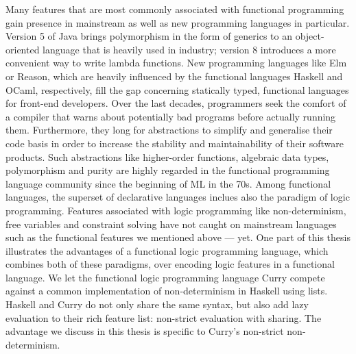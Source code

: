 %


Many features that are most commonly associated with functional programming gain presence in mainstream as well as new programming languages in particular.
Version 5 of Java brings polymorphism in the form of generics to an object-oriented language that is heavily used in industry; version 8 introduces a more convenient way to write lambda functions.
New programming languages like Elm or Reason, which are heavily influenced by the functional languages Haskell and OCaml, respectively, fill the gap concerning statically typed, functional languages for front-end developers.
Over the last decades, programmers seek the comfort of a compiler that warns about potentially bad programs before actually running them.
Furthermore, they long for abstractions to simplify and generalise their code basis in order to increase the stability and maintainability of their software products.
Such abstractions like higher-order functions, algebraic data types, polymorphism and purity are highly regarded in the functional programming language community since the beginning of ML in the 70s.
Among functional languages, the superset of declarative languages inclues also the paradigm of logic programming.
Features associated with logic programming like non-determinism, free variables and constraint solving have not caught on mainstream languages such as the functional features we mentioned above --- yet.
One part of this thesis illustrates the advantages of a functional logic programming language, which combines both of these paradigms, over encoding logic features in a functional language.
We let the functional logic programming language Curry compete against a common implementation of non-determinism in Haskell using lists.
Haskell and Curry do not only share the same syntax, but also add lazy evaluation to their rich feature list: non-strict evaluation with sharing.
The advantage we discuss in this thesis is specific to Curry's non-strict non-determinism.

